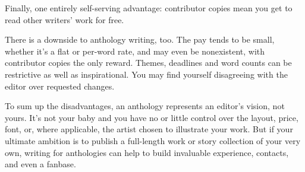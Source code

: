 Finally, one entirely self-serving advantage: contributor copies mean you get to read other writers' work for free.

There is a downside to anthology writing, too. The pay tends to be small, whether it's a flat or per-word rate, and may even be nonexistent, with contributor copies the only reward. Themes, deadlines and word counts can be restrictive as well as inspirational. You may find yourself disagreeing with the editor over requested changes.

To sum up the disadvantages, an anthology represents an editor's vision, not yours. It's not your baby and you have no or little control over the layout, price, font, or, where applicable, the artist chosen to illustrate your work. But if your ultimate ambition is to publish a full-length work or story collection of your very own, writing for anthologies can help to build invaluable experience, contacts, and even a fanbase.

